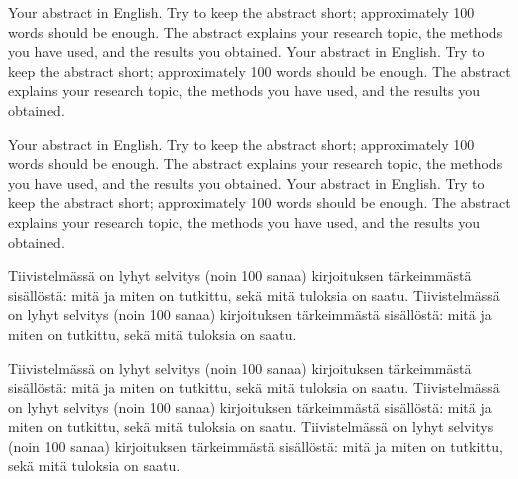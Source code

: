 \documentclass[english,12pt,a4paper,pdftex,sci,utf8]{aaltothesis}
\begin{document}
\makecoverpage



\begin{abstractpage}[english]
  Your abstract in English. Try to keep the abstract short; approximately 
  100 words should be enough. The abstract explains your research topic, 
  the methods you have used, and the results you obtained.  
  Your abstract in English. Try to keep the abstract short; approximately 
  100 words should be enough. The abstract explains your research topic, 
  the methods you have used, and the results you obtained.  

  Your abstract in English. Try to keep the abstract short; approximately 
  100 words should be enough. The abstract explains your research topic, 
  the methods you have used, and the results you obtained.  
  Your abstract in English. Try to keep the abstract short; approximately 
  100 words should be enough. The abstract explains your research topic, 
  the methods you have used, and the results you obtained.  
\end{abstractpage}

\newpage
%
\begin{abstractpage}[finnish]
  Tiivistelmässä on lyhyt selvitys (noin 100 sanaa)
  kirjoituksen tärkeimmästä sisällöstä: mitä ja miten on tutkittu,
  sekä mitä tuloksia on saatu. 
  Tiivistelmässä on lyhyt selvitys (noin 100 sanaa)
  kirjoituksen tärkeimmästä sisällöstä: mitä ja miten on tutkittu,
  sekä mitä tuloksia on saatu. 

  Tiivistelmässä on lyhyt selvitys (noin 100 sanaa)
  kirjoituksen tärkeimmästä sisällöstä: mitä ja miten on tutkittu,
  sekä mitä tuloksia on saatu. 
  Tiivistelmässä on lyhyt selvitys (noin 100 sanaa)
  kirjoituksen tärkeimmästä sisällöstä: mitä ja miten on tutkittu,
  sekä mitä tuloksia on saatu. 
  Tiivistelmässä on lyhyt selvitys (noin 100 sanaa)
  kirjoituksen tärkeimmästä sisällöstä: mitä ja miten on tutkittu,
  sekä mitä tuloksia on saatu. 
\end{abstractpage}
\end{document}
